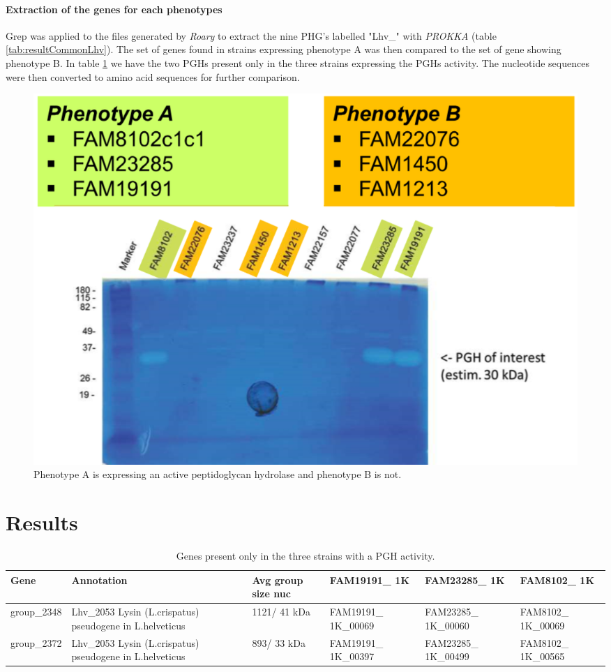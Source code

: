 \documentclass[10pt,a4paper]{article}
\begin{document}
\paragraph{Extraction of the genes for each phenotypes} Grep was applied to the files generated by \textit{Roary} to extract the nine PHG's \cite{jebava_nine_2011} labelled "Lhv\_" with \textit{PROKKA} (table \ref{tab:resultCommonLhv}). The set of genes found in strains expressing phenotype A was then compared to the set of gene showing phenotype B. In table \ref{tab:resultPGHexpr} we have the two PGHs present only in the three strains expressing the PGHs activity. The nucleotide sequences were then converted to amino acid sequences for further comparison. 


\begin{figure}
	\centering
	\includegraphics[width=0.6\linewidth]{img/zymography}
	\caption[The two phenotypes expressed by the six strains]{Phenotype A is expressing an active peptidoglycan hydrolase and phenotype B is not.}
	\label{fig:zymography}
\end{figure}


\newpage
\section*{Results}





\begin{table}[htbp]
	\centering
	\begin{tabularx}{\linewidth}{|X|X|X|X|X|X|}
		\hline
		\textbf{Gene} & \textbf{Annotation} & \textbf{Avg group size nuc} & \textbf{FAM19191\_ 1K} & \textbf{FAM23285\_ 1K} & \textbf{FAM8102\_ 1K}\\
		 \hline
		group\_2348 & Lhv\_2053 Lysin (L.crispatus) pseudogene in L.helveticus & 1121/ 41 kDa & FAM19191\_ 1K\_00069 & FAM23285\_ 1K\_00060 & FAM8102\_ 1K\_00069 \\
		\hline
		group\_2372 & Lhv\_2053 Lysin (L.crispatus) pseudogene in L.helveticus & 893/ 33 kDa & FAM19191\_ 1K\_00397 & FAM23285\_ 1K\_00499 & FAM8102\_ 1K\_00565 \\
		\hline	
	\end{tabularx}
	\caption{Genes present only in the three strains with a PGH activity.}
	\label{tab:resultPGHexpr}
\end{table}
\end{document}
